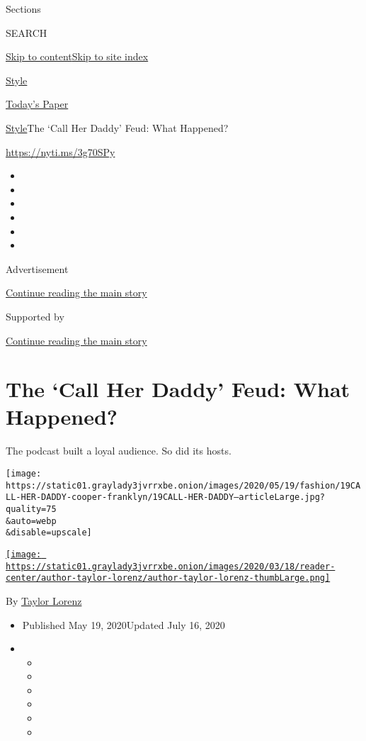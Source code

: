 Sections

SEARCH

\protect\hyperlink{site-content}{Skip to
content}\protect\hyperlink{site-index}{Skip to site index}

\href{https://www.nytimes3xbfgragh.onion/section/style}{Style}

\href{https://myaccount.nytimes3xbfgragh.onion/auth/login?response_type=cookie\&client_id=vi}{}

\href{https://www.nytimes3xbfgragh.onion/section/todayspaper}{Today's
Paper}

\href{/section/style}{Style}\textbar{}The `Call Her Daddy' Feud: What
Happened?

\url{https://nyti.ms/3g70SPy}

\begin{itemize}
\item
\item
\item
\item
\item
\item
\end{itemize}

Advertisement

\protect\hyperlink{after-top}{Continue reading the main story}

Supported by

\protect\hyperlink{after-sponsor}{Continue reading the main story}

\hypertarget{the-call-her-daddy-feud-what-happened}{%
\section{The `Call Her Daddy' Feud: What
Happened?}\label{the-call-her-daddy-feud-what-happened}}

The podcast built a loyal audience. So did its hosts.

\texttt{[image: https://static01.graylady3jvrrxbe.onion/images/2020/05/19/fashion/19CALL-HER-DADDY-cooper-franklyn/19CALL-HER-DADDY--articleLarge.jpg?quality=75\\\&auto=webp\\\&disable=upscale]}

\href{https://www.nytimes3xbfgragh.onion/by/taylor-lorenz}{\texttt{[image: https://static01.graylady3jvrrxbe.onion/images/2020/03/18/reader-center/author-taylor-lorenz/author-taylor-lorenz-thumbLarge.png]}}

By \href{https://www.nytimes3xbfgragh.onion/by/taylor-lorenz}{Taylor
Lorenz}

\begin{itemize}
\item
  Published May 19, 2020Updated July 16, 2020
\item
  \begin{itemize}
  \item
  \item
  \item
  \item
  \item
  \item
  \end{itemize}
\end{itemize}

